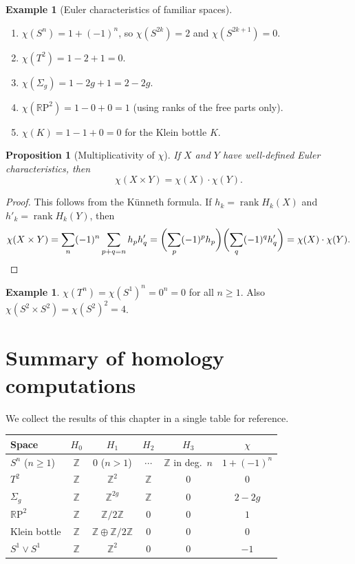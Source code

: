\documentclass[12pt,a4paper,openany]{book}
\theoremstyle{definition}
\newtheorem{example}[definition]{Example}
\theoremstyle{plain}
\newtheorem{proposition}[definition]{Proposition}
\theoremstyle{remark}
\newcommand{\Z}{\mathbb{Z}}
\newcommand{\RP}{\mathbb{R}\mathrm{P}}
\begin{document}
\begin{example}[Euler characteristics of familiar spaces]
\begin{enumerate}[label=(\roman*)]
  \item $\chi(S^n)=1+(-1)^n$, so $\chi(S^{2k})=2$ and $\chi(S^{2k+1})=0$.
  \item $\chi(T^2)=1-2+1=0$.
  \item $\chi(\Sigma_g)=1-2g+1=2-2g$.
  \item $\chi(\RP^2)=1-0+0=1$ (using ranks of the free parts only).
  \item $\chi(K)=1-1+0=0$ for the Klein bottle $K$.
\end{enumerate}
\end{example}

\begin{proposition}[Multiplicativity of $\chi$]\label{prop:euler-product}
If $X$ and $Y$ have well-defined Euler characteristics, then
\[
  \chi(X\times Y) = \chi(X)\cdot\chi(Y).
\]
\end{proposition}

\begin{proof}
This follows from the K\"unneth formula. If $h_k=\operatorname{rank}H_k(X)$
and $h'_k=\operatorname{rank}H_k(Y)$, then
\[
  \chi(X\times Y)
  = \sum_n(-1)^n\sum_{p+q=n}h_p h'_q
  = \biggl(\sum_p(-1)^p h_p\biggr)\biggl(\sum_q(-1)^q h'_q\biggr)
  = \chi(X)\cdot\chi(Y).\qedhere
\]
\end{proof}

\begin{example}
$\chi(T^n) = \chi(S^1)^n = 0^n = 0$ for all $n\geq 1$.
Also $\chi(S^2\times S^2) = \chi(S^2)^2 = 4$.
\end{example}

\section{Summary of homology computations}
\label{sec:mv-summary}

We collect the results of this chapter in a single table for reference.

\medskip
\begin{center}
\renewcommand{\arraystretch}{1.3}
\begin{tabular}{lccccc}
\toprule
\textbf{Space} & $H_0$ & $H_1$ & $H_2$ & $H_3$ & $\chi$ \\
\midrule
$S^n$ ($n\geq 1$) & $\Z$ & $0$ ($n>1$) & $\cdots$ & $\Z$ in deg.\ $n$ & $1+(-1)^n$ \\
$T^2$ & $\Z$ & $\Z^2$ & $\Z$ & $0$ & $0$ \\
$\Sigma_g$ & $\Z$ & $\Z^{2g}$ & $\Z$ & $0$ & $2-2g$ \\
$\RP^2$ & $\Z$ & $\Z/2\Z$ & $0$ & $0$ & $1$ \\
Klein bottle & $\Z$ & $\Z\oplus\Z/2\Z$ & $0$ & $0$ & $0$ \\
$S^1\vee S^1$ & $\Z$ & $\Z^2$ & $0$ & $0$ & $-1$ \\
\bottomrule
\end{tabular}
\end{center}
\medskip
\end{document}
